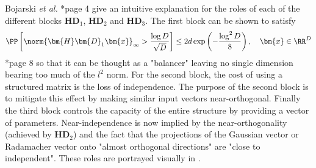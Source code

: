 Bojarski {\it et al.} \cite{BojarskiMariusz2016Saar}*{page 4} give an intuitive explanation for the roles of each of the different blocks $\bm{H} \bm{D}_1$, $\bm{H} \bm{D}_2$ and $\bm{H} \bm{D}_3$. The first block can be shown to satisfy
\[
    \PP \left[ \norm{\bm{H}\bm{D}_1 \bm{x}}_{\infty} > \frac{\log D}{\sqrt{D}} \right] \leq 2 d \exp \left( {-\frac{\log^2 D}{8}} \right), \quad \bm{x} \in \RR^D
\]
\cite{LiuFanghui2021RFfK}*{page 8} so that it can be thought as a "balancer" leaving no single dimension bearing too much of the $l^2$ norm. For the second block, the cost of using a structured matrix is the loss of independence. The purpose of the second block is to mitigate this effect by making similar input vectors near-orthogonal. Finally the third block controls the capacity of the entire structure by providing a vector of parameters. Near-independence is now implied by the near-orthogonality (achieved by $\bm{H} \bm{D}_2$) and the fact that the projections of the Gaussian vector or Radamacher vector onto "almost orthogonal directions" are "close to independent". These roles are portrayed visually in .
